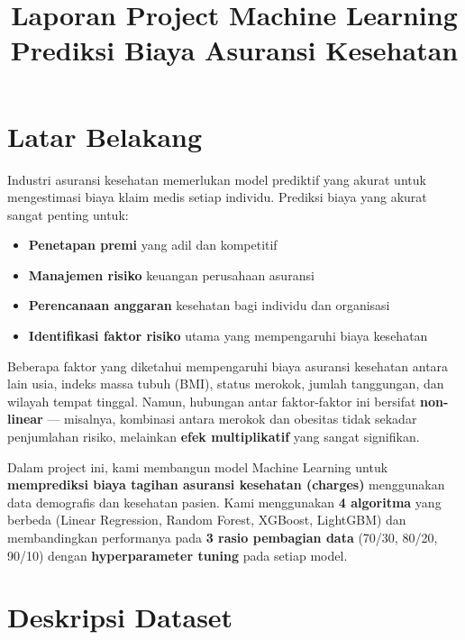 \documentclass[12pt,a4paper]{article}
\title{
    \vspace{-1cm}
    \textbf{Laporan Project Machine Learning} \\[0.4cm]
    \Large Prediksi Biaya Asuransi Kesehatan
}
\author{}
\date{}
\begin{document}
\maketitle
\thispagestyle{fancy}

\tableofcontents
\newpage

\section{Latar Belakang}

Industri asuransi kesehatan memerlukan model prediktif yang akurat untuk mengestimasi biaya klaim medis setiap individu.  Prediksi biaya yang akurat sangat penting untuk:

\begin{itemize}
    \item \textbf{Penetapan premi} yang adil dan kompetitif
    \item \textbf{Manajemen risiko} keuangan perusahaan asuransi
    \item \textbf{Perencanaan anggaran} kesehatan bagi individu dan organisasi
    \item \textbf{Identifikasi faktor risiko} utama yang mempengaruhi biaya kesehatan
\end{itemize}

Beberapa faktor yang diketahui mempengaruhi biaya asuransi kesehatan antara lain usia, indeks massa tubuh (BMI), status merokok, jumlah tanggungan, dan wilayah tempat tinggal. Namun, hubungan antar faktor-faktor ini bersifat \textbf{non-linear} — misalnya, kombinasi antara merokok dan obesitas tidak sekadar penjumlahan risiko, melainkan \textbf{efek multiplikatif} yang sangat signifikan.

Dalam project ini, kami membangun model Machine Learning untuk \textbf{memprediksi biaya tagihan asuransi kesehatan (charges)} menggunakan data demografis dan kesehatan pasien.  Kami menggunakan \textbf{4 algoritma} yang berbeda (Linear Regression, Random Forest, XGBoost, LightGBM) dan membandingkan performanya pada \textbf{3 rasio pembagian data} (70/30, 80/20, 90/10) dengan \textbf{hyperparameter tuning} pada setiap model.


\section{Deskripsi Dataset}
\end{document}
